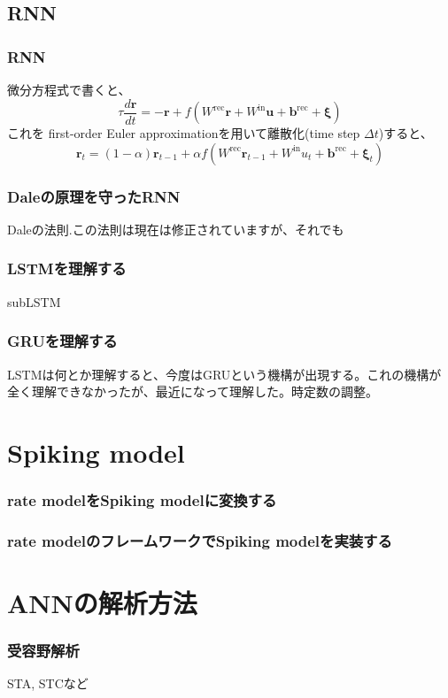 \documentclass[a4j]{jarticle}
\begin{document}
\subsection{RNN}
\subsubsection{RNN}
微分方程式で書くと、
$$
\tau \frac{d\boldsymbol{r}}{dt}=-\boldsymbol{r}+f(W^{\text{rec}}\boldsymbol{r}+W^{\text{in}}\boldsymbol{u}+\boldsymbol{b}^{\text{rec}}+\boldsymbol{\xi})
$$
これを first-order Euler approximationを用いて離散化(time step $\Delta t$)すると、
$$
\boldsymbol{r}_t=(1-\alpha) \boldsymbol{r}_{t-1}+\alpha f(W^{\text{rec}}\boldsymbol{r}_{t-1}+W^{\text{in}}u_{t}+\boldsymbol{b}^{\text{rec}}+\boldsymbol{\xi}_t)
$$


\subsubsection{Daleの原理を守ったRNN}
Daleの法則.この法則は現在は修正されていますが、それでも
\subsubsection{LSTMを理解する}
subLSTM
\subsubsection{GRUを理解する}
LSTMは何とか理解すると、今度はGRUという機構が出現する。これの機構が全く理解できなかったが、最近になって理解した。時定数の調整。

\section{Spiking model}
\subsubsection{rate modelをSpiking modelに変換する}
\subsubsection{rate modelのフレームワークでSpiking modelを実装する}

\section{ANNの解析方法}
\subsubsection{受容野解析}
STA, STCなど
\end{document}
